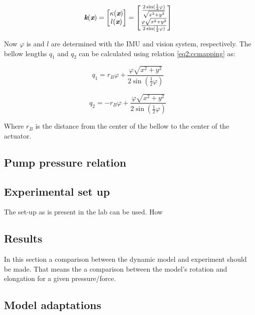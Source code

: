 \begin{equation}
    \textit{\textbf{k}}(\textit{\textbf{x}}) = \begin{bmatrix} \kappa(\textit{\textbf{x}}) \\ l(\textit{\textbf{x}}) \end{bmatrix} = \begin{bmatrix} \frac{2 \sin (\frac{1}{2}\varphi)}{\sqrt{x^2+y^2}} \\
    \frac{\varphi \sqrt{x^2+y^2}}{2 \sin(\frac{1}{2}\varphi)} \end{bmatrix}
\end{equation}

Now $\varphi$ is and $l$ are determined with the IMU and vision system, respectively. The bellow lengths $q_1$ and $q_2$ can be calculated using relation \ref{eq2:ccmapping} as:

\begin{equation}
    q_1 = r_B \varphi + \frac{\varphi \sqrt{x^2+y^2}}{2 \sin(\frac{1}{2}\varphi)}
\end{equation}

\begin{equation}
    q_2 = -r_B \varphi + \frac{\varphi \sqrt{x^2+y^2}}{2 \sin(\frac{1}{2}\varphi)}
\end{equation}

Where $r_B$ is the distance from the center of the bellow to the center of the actuator.


\subsection{Pump pressure relation}





\subsection{Experimental set up}


The set-up as is present in the lab can be used. How









\subsection{Results}

In this section a comparison between the dynamic model and experiment should be made. That means the a comparison between the model's rotation and elongation for a given pressure/force.  


\subsection{Model adaptations}




